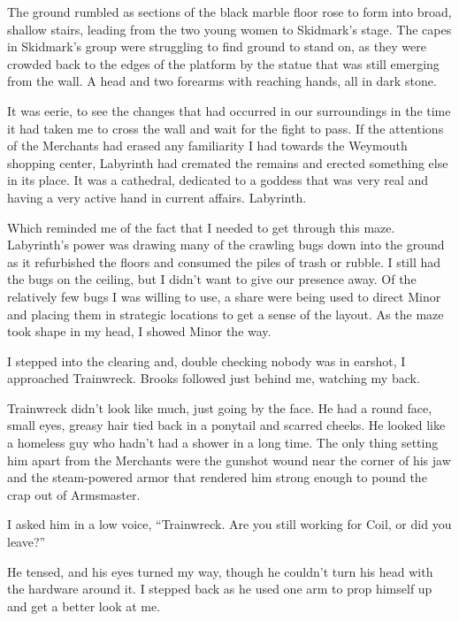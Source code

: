 The ground rumbled as sections of the black marble floor rose to form into broad, shallow stairs, leading from the two young women to Skidmark's stage.  The capes in Skidmark's group were struggling to find ground to stand on, as they were crowded back to the edges of the platform by the statue that was still emerging from the wall.  A head and two forearms with reaching hands, all in dark stone.



It was eerie, to see the changes that had occurred in our surroundings in the time it had taken me to cross the wall and wait for the fight to pass.  If the attentions of the Merchants had erased any familiarity I had towards the Weymouth shopping center, Labyrinth had cremated the remains and erected something else in its place.  It was a cathedral, dedicated to a goddess that was very real and having a very active hand in current affairs.  Labyrinth.



Which reminded me of the fact that I needed to get through this maze.  Labyrinth's power was drawing many of the crawling bugs down into the ground as it refurbished the floors and consumed the piles of trash or rubble.  I still had the bugs on the ceiling, but I didn't want to give our presence away.  Of the relatively few bugs I was willing to use, a share were being used to direct Minor and placing them in strategic locations to get a sense of the layout.  As the maze took shape in my head, I showed Minor the way.



I stepped into the clearing and, double checking nobody was in earshot, I approached Trainwreck.  Brooks followed just behind me, watching my back.



Trainwreck didn't look like much, just going by the face.  He had a round face, small eyes, greasy hair tied back in a ponytail and scarred cheeks.  He looked like a homeless guy who hadn't had a shower in a long time.  The only thing setting him apart from the Merchants were the gunshot wound near the corner of his jaw and the steam-powered armor that rendered him strong enough to pound the crap out of Armsmaster.



I asked him in a low voice, ``Trainwreck.  Are you still working for Coil, or did you leave?''



He tensed, and his eyes turned my way, though he couldn't turn his head with the hardware around it.  I stepped back as he used one arm to prop himself up and get a better look at me.



